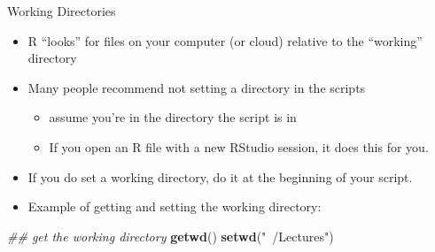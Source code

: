 \documentclass[
  ignorenonframetext,
]{beamer}
\newenvironment{Shaded}{\begin{snugshade}}{\end{snugshade}}
\newcommand{\CommentTok}[1]{\textcolor[rgb]{0.56,0.35,0.01}{\textit{#1}}}
\newcommand{\KeywordTok}[1]{\textcolor[rgb]{0.13,0.29,0.53}{\textbf{#1}}}
\newcommand{\NormalTok}[1]{#1}
\newcommand{\StringTok}[1]{\textcolor[rgb]{0.31,0.60,0.02}{#1}}
\providecommand{\tightlist}{%
  \setlength{\itemsep}{0pt}\setlength{\parskip}{0pt}}
\begin{document}
\begin{frame}[fragile]{Working Directories}
\protect\hypertarget{working-directories}{}

\begin{itemize}
\tightlist
\item
  R ``looks'' for files on your computer (or cloud) relative to the
  ``working'' directory
\item
  Many people recommend not setting a directory in the scripts

  \begin{itemize}
  \tightlist
  \item
    assume you're in the directory the script is in
  \item
    If you open an R file with a new RStudio session, it does this for
    you.
  \end{itemize}
\item
  If you do set a working directory, do it at the beginning of your
  script.
\item
  Example of getting and setting the working directory:
\end{itemize}

\begin{Shaded}
\begin{Highlighting}[]
\CommentTok{## get the working directory}
\KeywordTok{getwd}\NormalTok{()}
\KeywordTok{setwd}\NormalTok{(}\StringTok{"~/Lectures"}\NormalTok{) }
\end{Highlighting}
\end{Shaded}

\end{frame}
\end{document}
